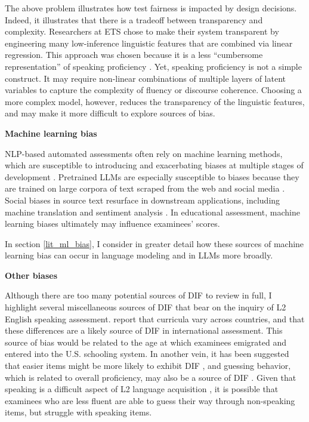 \documentclass [PhD] {uclathes}
\begin{document}
The above problem illustrates how test fairness is impacted by design decisions. Indeed, it illustrates that there is a tradeoff between transparency and complexity. Researchers at ETS chose to make their system transparent by engineering many low-inference linguistic features that are combined via linear regression. This approach was chosen because it is a less “cumbersome representation” of speaking proficiency \citep[][p. 83]{loukina2019scoring}. Yet, speaking proficiency is not a simple construct. It may require non-linear combinations of multiple layers of latent variables to capture the complexity of fluency or discourse coherence. Choosing a more complex model, however, reduces the transparency of the linguistic features, and may make it more difficult to explore sources of bias.

\noindent \textbf{Machine learning bias} \;

NLP-based automated assessments often rely on machine learning methods, which are susceptible to introducing and exacerbating biases at multiple stages of development \citep{suresh2021framework}. Pretrained LLMs are especially susceptible to biases because they are trained on large corpora of text scraped from the web and social media \citep{blodgett2020}. Social biases in source text resurface in downstream applications, including machine translation \citep{stanovsky2019evaluating} and sentiment analysis \citep{kiritchenko2018examining}. In educational assessment, machine learning biases ultimately may influence examinees’ scores. 

In section \ref{lit_ml_bias}, I consider in greater detail how these sources of machine learning bias can occur in language modeling and in LLMs more broadly. 

\noindent \textbf{Other biases} \;

Although there are too many potential sources of DIF to review in full, I highlight several miscellaneous sources of DIF that bear on the inquiry of L2 English speaking assessment. \citet{huang2016exploring} report that curricula vary across countries, and that these differences are a likely source of DIF in international assessment. This source of bias would be related to the age at which examinees emigrated and entered into the U.S. schooling system. In another vein, it has been suggested that easier items might be more likely to exhibit DIF \citep{santelices2010unfair}, and guessing behavior, which is related to overall proficiency, may also be a source of DIF \citep{dorans2004examining}. Given that speaking is a difficult aspect of L2 language acquisition \citep{brown2000principles}, it is possible that examinees who are less fluent are able to guess their way through non-speaking items, but struggle with speaking items.
\end{document}
